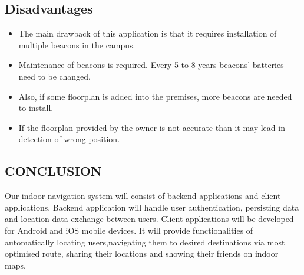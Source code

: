 \documentclass[a4paper, 12pt]{article}
\begin{document}
\subsection{Disadvantages}
\begin{itemize}
	\item The main drawback of this application is that it requires installation of multiple beacons in the campus.
	\item Maintenance of beacons is required. Every 5 to 8 years beacons’ batteries need to be changed.
	\item 	Also, if some floorplan is added into the premises, more beacons are needed to install.
	\item If the floorplan provided by the owner is not accurate than it may lead in detection of wrong position.

\end{itemize}

\newpage


\begin{center}
\section{CONCLUSION}
\end{center}
\par
Our indoor navigation system will consist of backend applications and client applications. Backend application will handle user authentication, persisting data and location data exchange between users. Client applications will be developed for Android and iOS mobile devices. It will provide functionalities of automatically locating users,navigating them to desired destinations via most optimised route, sharing their locations and showing their friends on indoor maps. 
\\

\newpage

%
%

\end{document}
